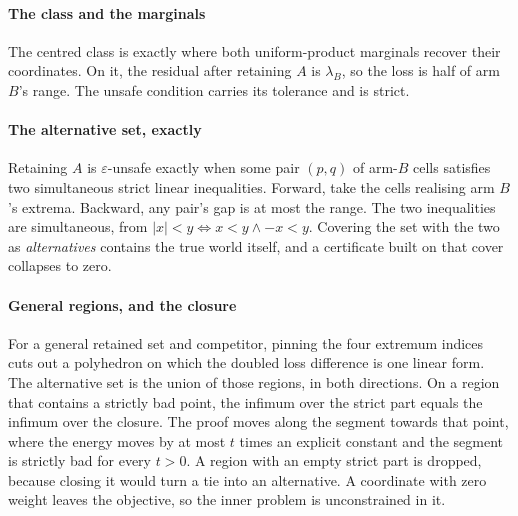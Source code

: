 
\paragraph{The class and the marginals} The centred class is exactly where both
uniform-product marginals recover their coordinates. On it, the residual after retaining $A$
is $\lambda_{B}$, so the loss is half of arm $B$'s range. The unsafe condition carries its
tolerance and is strict.


\paragraph{The alternative set, exactly} Retaining $A$ is $\varepsilon$-unsafe exactly when some
pair $(p,q)$ of arm-$B$ cells satisfies two simultaneous strict linear inequalities. Forward,
take the cells realising arm $B$'s extrema. Backward, any pair's gap is at most the range. The
two inequalities are simultaneous, from $|x|<y\iff x<y\wedge -x<y$. Covering the set with the
two as \emph{alternatives} contains the true world itself, and a certificate built on that
cover collapses to zero.


\paragraph{General regions, and the closure} For a general retained set and competitor, pinning
the four extremum indices cuts out a polyhedron on which the doubled loss difference is one
linear form. The alternative set is the union of those regions, in both directions. On a
region that contains a strictly bad point, the infimum over the strict part equals the infimum
over the closure. The proof moves along the segment towards that point, where the energy moves
by at most $t$ times an explicit constant and the segment is strictly bad for every $t>0$. A
region with an empty strict part is dropped, because closing it would turn a tie into an
alternative. A coordinate with zero weight leaves the objective, so the inner problem is
unconstrained in it.


